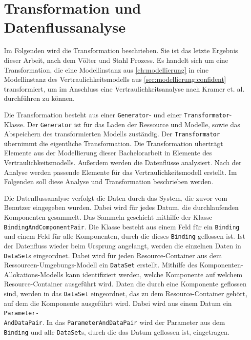 \section{Transformation und Datenflussanalyse}
\label{sec:implementierung}
Im Folgenden wird die Transformation beschrieben. Sie ist das letzte Ergebnis dieser Arbeit, nach dem Völter und Stahl Prozess. Es handelt sich um eine Transformation, die eine Modellinstanz aus \autoref{ch:modellierung} in eine Modellinstanz des Vertraulichkeitsmodells aus \autoref{sec:modellierung:confident} transformiert, um im Anschluss eine Vertraulichkeitsanalyse nach Kramer et. al. \cite{Kramera} durchführen zu können. \par
Die Transformation besteht aus einer \texttt{Generator}- und einer \texttt{Transformator}-Klasse. Der \texttt{Generator} ist für das Laden der Ressource und Modelle, sowie das Abspeichern des transformierten Modells zuständig. Der \texttt{Transformator} übernimmt die eigentliche Transformation. Die Transformation überträgt Elemente aus der Modellierung dieser Bachelorarbeit in Elemente des Vertraulichkeitsmodells. Außerdem werden die Datenflüsse analysiert. Nach der Analyse werden passende Elemente für das Vertraulichkeitsmodell erstellt. Im Folgenden soll diese Analyse und Transformation beschrieben werden. \par 
Die Datenflussanalyse verfolgt die Daten durch das System, die zuvor vom Benutzer eingegeben wurden. Dabei wird für jedes Datum, die durchlaufenden Komponenten gesammelt. Das Sammeln geschieht mithilfe der Klasse \texttt{BindingAndComponentPair}. Die Klasse besteht aus einem Feld für ein \texttt{Binding} und einem Feld für alle Komponenten, durch die dieses \texttt{Binding} geflossen ist. Ist der Datenfluss wieder beim Ursprung angelangt, werden die einzelnen Daten in \texttt{DataSet}s eingeordnet. Dabei wird für jeden Resource-Container aus dem Ressourcen-Umgebungs-Modell ein \texttt{DataSet} erstellt. Mithilfe des Komponenten-Allokations-Modells kann identifiziert werden, welche Komponente auf welchem Resource-Container ausgeführt wird. Daten die durch eine Komponente geflossen sind, werden in das \texttt{DataSet} eingeordnet, das zu dem Resource-Container gehört, auf dem die Komponente ausgeführt wird. Dabei wird aus einem Datum ein \texttt{Parameter-\\AndDataPair}. In das \texttt{ParameterAndDataPair} wird der Parameter aus dem \texttt{Binding} und alle \texttt{DataSet}s, durch die das Datum geflossen ist, eingetragen. \par
